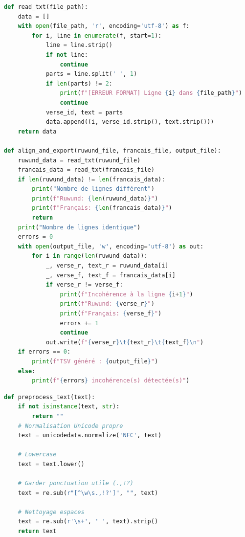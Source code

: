 \begin{lstlisting}[language=Python, caption={Script d'alignement automatique}, label={code:alignement-automatique}]
def read_txt(file_path):
    data = []
    with open(file_path, 'r', encoding='utf-8') as f:
        for i, line in enumerate(f, start=1):
            line = line.strip()
            if not line:
                continue
            parts = line.split(' ', 1)
            if len(parts) != 2:
                print(f"[ERREUR FORMAT] Ligne {i} dans {file_path}")
                continue
            verse_id, text = parts
            data.append((i, verse_id.strip(), text.strip()))
    return data

def align_and_export(ruwund_file, francais_file, output_file):
    ruwund_data = read_txt(ruwund_file)
    francais_data = read_txt(francais_file)
    if len(ruwund_data) != len(francais_data):
        print("Nombre de lignes différent")
        print(f"Ruwund: {len(ruwund_data)}")
        print(f"Français: {len(francais_data)}")
        return
    print("Nombre de lignes identique")
    errors = 0
    with open(output_file, 'w', encoding='utf-8') as out:
        for i in range(len(ruwund_data)):
            _, verse_r, text_r = ruwund_data[i]
            _, verse_f, text_f = francais_data[i]
            if verse_r != verse_f:
                print(f"Incohérence à la ligne {i+1}")
                print(f"Ruwund: {verse_r}")
                print(f"Français: {verse_f}")
                errors += 1
                continue
            out.write(f"{verse_r}\t{text_r}\t{text_f}\n")
    if errors == 0:
        print(f"TSV généré : {output_file}")
    else:
        print(f"{errors} incohérence(s) détectée(s)")
\end{lstlisting}
\begin{lstlisting}[language=Python, caption={Prétraitement du Texte pour la Normalisation}, label={code:pretraitement-textes}]
def preprocess_text(text):
    if not isinstance(text, str):
        return ""
    # Normalisation Unicode propre
    text = unicodedata.normalize('NFC', text)

    # Lowercase
    text = text.lower()

    # Garder ponctuation utile (.,!?)
    text = re.sub(r"[^\w\s.,!?']", "", text)

    # Nettoyage espaces
    text = re.sub(r'\s+', ' ', text).strip()
    return text
\end{lstlisting}
